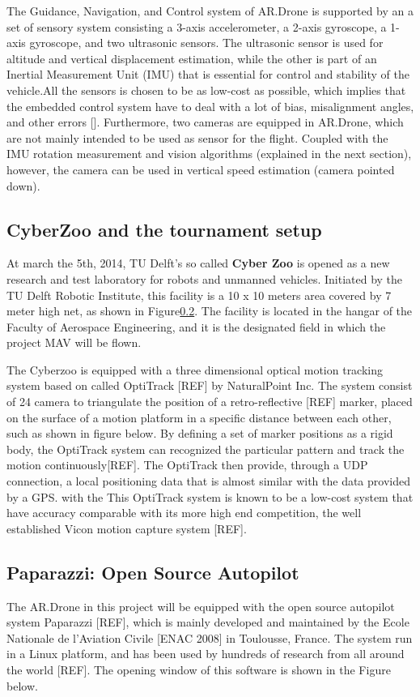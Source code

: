 {The Guidance, Navigation, and Control system of AR.Drone is supported by an a set of sensory system consisting a 3-axis accelerometer, a 2-axis gyroscope, a 1-axis gyroscope, and two ultrasonic sensors. The ultrasonic sensor is used for altitude and vertical displacement estimation, while the other is part of an Inertial Measurement Unit (IMU) that is essential for control and stability of the vehicle.All the sensors is chosen to be as low-cost as possible, which implies that the embedded control system have to deal with a lot of bias, misalignment angles, and other errors []. Furthermore, two cameras are equipped in AR.Drone, which are not mainly intended to be used as sensor for the flight. Coupled with the IMU rotation measurement and vision algorithms (explained in the next section), however, the camera can be used in vertical speed estimation (camera pointed down). 

\subsection{CyberZoo and the tournament setup}
At march the 5th, 2014, TU Delft's so called \textbf{Cyber Zoo} is opened as a new research and test laboratory for robots and unmanned vehicles. Initiated by the TU Delft Robotic Institute, this facility is a 10 x 10 meters area covered by 7 meter high net, as shown in Figure\ref{}. The facility is located in the hangar of the Faculty of Aerospace Engineering, and it is the designated field in which the project MAV will be flown.


The Cyberzoo is equipped with a three dimensional optical motion tracking system based on called OptiTrack [REF] by NaturalPoint Inc. The system consist of 24 camera to triangulate the position of a retro-reflective [REF] marker, placed on the surface of a motion platform in a specific distance between each other, such as shown in figure{} below. By defining a set of marker positions as a rigid body, the OptiTrack system can recognized the particular pattern and track the motion continuously[REF]. The OptiTrack then provide, through a UDP connection, a local positioning data that is almost similar with the data provided by a GPS. with the This OptiTrack system is known to be a low-cost system that have accuracy comparable with its more high end competition, the well established Vicon motion capture system [REF].


\subsection{Paparazzi: Open Source Autopilot}
The AR.Drone in this project will be equipped with the open source autopilot system Paparazzi [REF], which is mainly developed and maintained by the Ecole Nationale de l'Aviation Civile [ENAC 2008] in Toulousse, France. The system run in a Linux platform, and has been used by hundreds of research from all around the world [REF]. The opening window of this software is shown in the Figure below.

}
